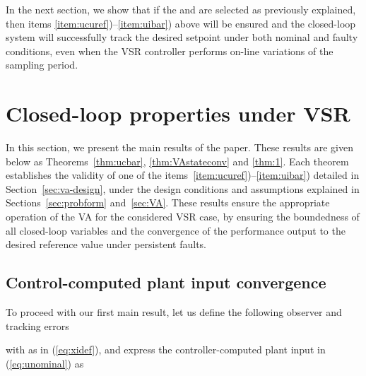 \documentclass[letterpaper, 10 pt, conference]{ieeeconf}
\begin{document}
In the next section, we show that if the  and  are
selected as previously explained, then items
\ref{item:ucuref})--\ref{item:uibar}) above will be ensured and the
closed-loop system will successfully track the desired setpoint
 under both nominal and faulty conditions, even when the VSR
controller performs on-line variations of the sampling period.

\section{Closed-loop properties under VSR}
\label{sec:cl-props}
In this section, we present the main results of the paper. These results are given below as Theorems~\ref{thm:ucbar}, \ref{thm:VAstateconv} and \ref{thm:1}. Each theorem establishes the validity of one of the items~\ref{item:ucuref})--\ref{item:uibar}) detailed in Section~\ref{sec:va-design}, under the design conditions and assumptions explained in Sections~\ref{sec:probform} and~\ref{sec:VA}. These
results ensure the appropriate operation of the VA for the considered
VSR case, by ensuring the boundedness of all closed-loop variables and the convergence of the performance output to the desired reference value under persistent faults.

\subsection{Control-computed plant input convergence}
\label{sec:convergence}
To proceed with our first main result, let us define the following
observer and tracking errors

with  as in (\ref{eq:xidef}), and express the
controller-computed plant input  in (\ref{eq:unominal}) as
\end{document}
